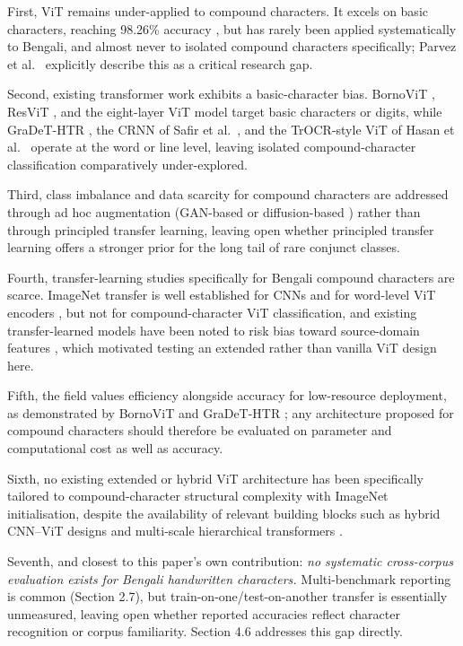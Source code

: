 First, ViT remains under-applied to compound characters. It excels on
basic characters, reaching 98.26\% accuracy \citep{ref17}, but has rarely
been applied systematically to Bengali, and almost never to isolated
compound characters specifically; Parvez et al.~\citeyearpar{ref17} explicitly
describe this as a critical research gap.

Second, existing transformer work exhibits a basic-character bias.
BornoViT \citep{ref18}, ResViT \citep{ref19}, and the eight-layer ViT model
\citep{ref38} target basic characters or digits, while GraDeT-HTR \citep{ref20},
the CRNN of Safir et al.~\citeyearpar{ref39}, and the TrOCR-style ViT of Hasan et
al.~\citeyearpar{ref21} operate at the word or line level, leaving isolated
compound-character classification comparatively under-explored.

Third, class imbalance and data scarcity for compound characters are
addressed through ad hoc augmentation (GAN-based \citep{ref37} or
diffusion-based \citep{ref24}) rather than through principled transfer
learning, leaving open whether principled transfer learning offers a stronger prior for the long tail of rare conjunct classes.

Fourth, transfer-learning studies specifically for Bengali compound
characters are scarce. ImageNet transfer is well established for CNNs
\citep{ref11,ref12} and for word-level ViT encoders \citep{ref21}, but not for
compound-character ViT classification, and existing transfer-learned
models have been noted to risk bias toward source-domain features
\citep{ref17}, which motivated testing an extended rather than vanilla ViT design here.

Fifth, the field values efficiency alongside accuracy for low-resource
deployment, as demonstrated by BornoViT \citep{ref18} and GraDeT-HTR
\citep{ref20}; any architecture proposed for compound characters should therefore be evaluated on parameter and computational cost as well as accuracy.

Sixth, no existing extended or hybrid ViT architecture has been
specifically tailored to compound-character structural complexity with
ImageNet initialisation, despite the availability of relevant building
blocks such as hybrid CNN--ViT designs \citep{ref19,ref25} and
multi-scale hierarchical transformers \citep{ref42}.

Seventh, and closest to this paper's own contribution: \emph{no
systematic cross-corpus evaluation exists for Bengali handwritten
characters.} Multi-benchmark reporting is common (Section 2.7), but
train-on-one/test-on-another transfer is essentially unmeasured, leaving
open whether reported accuracies reflect character recognition or corpus
familiarity. Section 4.6 addresses this gap directly.

